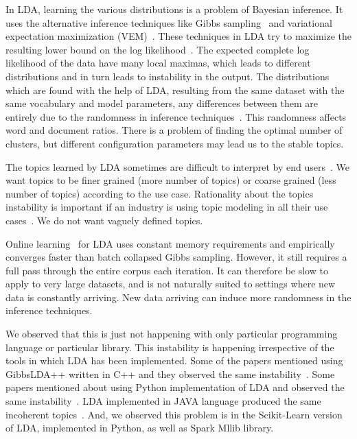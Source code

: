 \documentclass[conference]{IEEEtran}
\theoremstyle{break}
\begin{document}
\begin{compactitem}
    \item In LDA, learning the various distributions is a problem of Bayesian inference. It uses the alternative inference techniques like Gibbs sampling~\cite{wei2006lda, griffiths2004finding} and variational expectation maximization (VEM)~\cite{minka2002expectation}. These techniques in LDA try to maximize the resulting lower bound on the log likelihood~\cite{blei2003latent}. The expected complete log likelihood of the data have many local maximas, which leads to different distributions and in turn leads to instability in the output. The distributions which are found with the help of LDA, resulting from the same dataset with the same vocabulary and model parameters, any differences between them are entirely due to the randomness in inference techniques~\cite{koltcov2014latent}. This randomness affects word and document ratios. There is a problem of finding the optimal number of clusters, but different configuration parameters may lead us to the stable topics.
    \item The topics learned by LDA sometimes are difficult to interpret by end users~\cite{yang2015improving, panichella2013effectively}. We want topics to be finer grained (more number of topics) or coarse grained (less number of topics) according to the use case. Rationality about the topics instability is important if an industry is using topic modeling in all their use cases~\cite{lau2014machine, o2015analysis}. We do not want vaguely defined topics.
    \item Online learning~\cite{hoffman2010online} for LDA uses constant memory requirements and empirically converges faster than batch collapsed Gibbs sampling. However, it still requires a full pass through the entire corpus each iteration. It can therefore be slow to apply to very large datasets, and is not naturally suited to settings where new data is constantly arriving. New data arriving can induce more randomness in the inference techniques.
    \item We observed that this is just not happening with only particular programming language or particular library. This instability is happening irrespective of the tools in which LDA has been implemented. Some of the papers mentioned using GibbsLDA++ written in C++ and they observed the same instability~\cite{lukins2008source, tian2009using, guzman2014users}. Some papers mentioned about using Python implementation of LDA and observed the same instability~\cite{guzman2014users}. LDA implemented in JAVA language produced the same incoherent topics~\cite{martin2015app, hindle2011automated}. And, we observed this problem is in the Scikit-Learn version of LDA, implemented in Python, as well as Spark Mllib library.
\end{compactitem}
\end{document}
